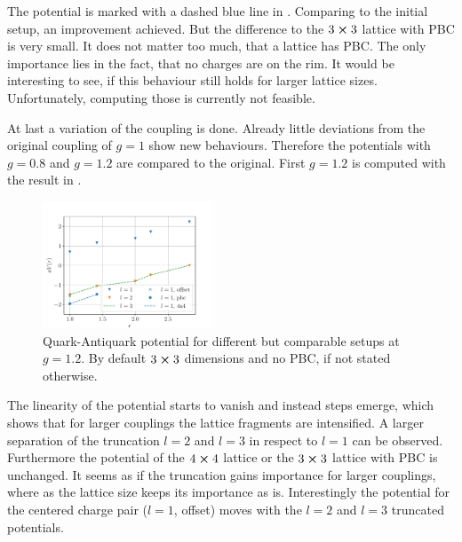 The potential is marked with a dashed blue line in . Comparing to the initial setup, an improvement achieved. But the difference to the $3\cross 3$ lattice with PBC is very small. It does not matter too much, that a lattice has PBC. The only importance lies in the fact, that no charges are on the rim. It would be interesting to see, if this behaviour still holds for larger lattice sizes. Unfortunately, computing those is currently not feasible.


At last a variation of the coupling is done. Already little deviations from the original coupling of $g=1$ show new behaviours. Therefore the potentials with $g=0.8$ and $g=1.2$ are compared to the original.
First $g=1.2$ is computed with the result in .
\begin{figure}[h]
	\begin{center}
		\includegraphics[width=0.45\textwidth]{images/quark_antiquark_potential_large_g.pdf}
	\end{center}
	\caption{Quark-Antiquark potential for different but comparable setups at $g=\num{1.2}$. By default $3\cross3$ dimensions and no PBC, if not stated otherwise.}\label{fig:qqbarl}
\end{figure}
The linearity of the potential starts to vanish and instead steps emerge, which shows that for larger couplings the lattice fragments are intensified.
A larger separation of the truncation $l=2$ and $l=3$ in respect to $l=1$ can be observed. Furthermore the potential of the $4\cross4$ lattice or the $3\cross3$ lattice with PBC is unchanged. It seems as if the truncation gains importance for larger couplings, where as the lattice size keeps its importance as is. Interestingly the potential for the centered charge pair ($l=1$, offset) moves with the $l=2$ and $l=3$ truncated potentials.

